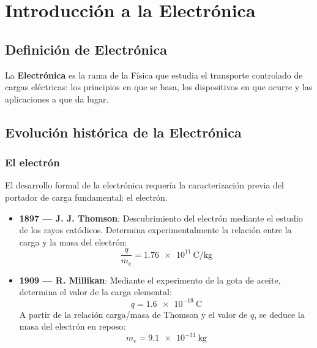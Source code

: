 \chapter{Introducción a la Electrónica}

\section{Definición de Electrónica}

\begin{concepto}
La \textbf{Electrónica} es la rama de la Física que estudia el transporte controlado de cargas eléctricas: los principios en que se basa, los dispositivos en que ocurre y las aplicaciones a que da lugar.
\end{concepto}

\section{Evolución histórica de la Electrónica}

\subsection{El electrón}

El desarrollo formal de la electrónica requería la caracterización previa del portador de carga fundamental: el electrón.

\begin{itemize}
    \item \textbf{1897 --- J. J. Thomson}: Descubrimiento del electrón mediante el estudio de los rayos catódicos. Determina experimentalmente la relación entre la carga y la masa del electrón:
    \[
    \frac{q}{m_e} = \SI{1.76e11}{\coulomb\per\kilogram}
    \]
    
    \item \textbf{1909 --- R. Millikan}: Mediante el experimento de la gota de aceite, determina el valor de la carga elemental:
    \[
    q = \SI{1.6e-19}{\coulomb}
    \]
    A partir de la relación carga/masa de Thomson y el valor de $q$, se deduce la masa del electrón en reposo:
    \[
    m_e = \SI{9.1e-31}{\kilogram}
    \]
\end{itemize}

